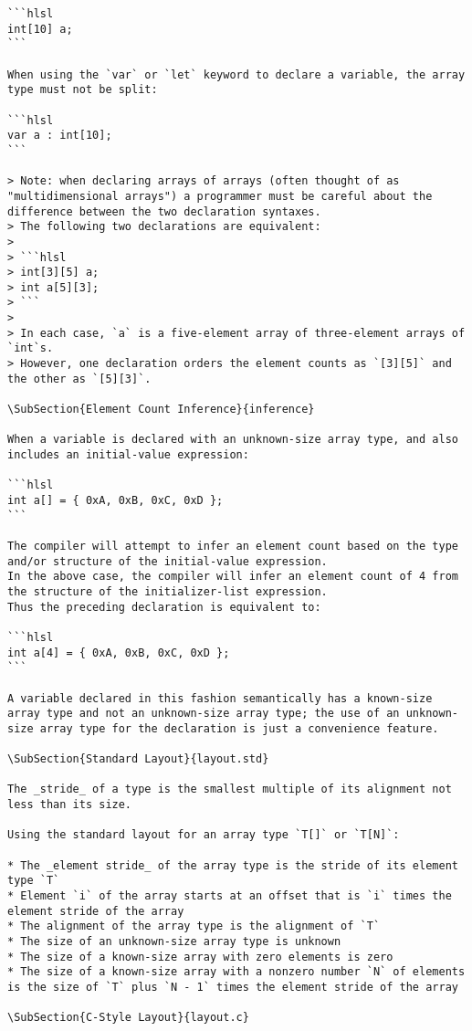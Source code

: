 \begin{verbatim}
```hlsl
int[10] a;
```

When using the `var` or `let` keyword to declare a variable, the array type must not be split:

```hlsl
var a : int[10];
```

> Note: when declaring arrays of arrays (often thought of as "multidimensional arrays") a programmer must be careful about the difference between the two declaration syntaxes.
> The following two declarations are equivalent:
>
> ```hlsl
> int[3][5] a;
> int a[5][3];
> ```
>
> In each case, `a` is a five-element array of three-element arrays of `int`s.
> However, one declaration orders the element counts as `[3][5]` and the other as `[5][3]`.

\SubSection{Element Count Inference}{inference}

When a variable is declared with an unknown-size array type, and also includes an initial-value expression:

```hlsl
int a[] = { 0xA, 0xB, 0xC, 0xD };
```

The compiler will attempt to infer an element count based on the type and/or structure of the initial-value expression.
In the above case, the compiler will infer an element count of 4 from the structure of the initializer-list expression.
Thus the preceding declaration is equivalent to:

```hlsl
int a[4] = { 0xA, 0xB, 0xC, 0xD };
```

A variable declared in this fashion semantically has a known-size array type and not an unknown-size array type; the use of an unknown-size array type for the declaration is just a convenience feature.

\SubSection{Standard Layout}{layout.std}

The _stride_ of a type is the smallest multiple of its alignment not less than its size.

Using the standard layout for an array type `T[]` or `T[N]`:

* The _element stride_ of the array type is the stride of its element type `T`
* Element `i` of the array starts at an offset that is `i` times the element stride of the array
* The alignment of the array type is the alignment of `T`
* The size of an unknown-size array type is unknown
* The size of a known-size array with zero elements is zero
* The size of a known-size array with a nonzero number `N` of elements is the size of `T` plus `N - 1` times the element stride of the array

\SubSection{C-Style Layout}{layout.c}


\end{verbatim}
